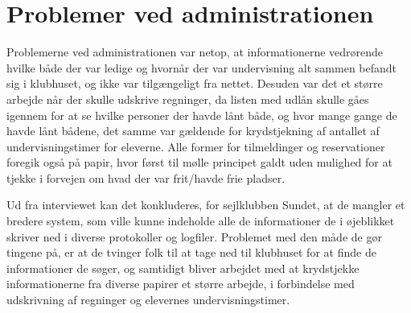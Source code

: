 \section*{Problemer ved administrationen}
Problemerne ved administrationen var netop, at informationerne vedrørende hvilke både der var ledige og hvornår der var undervisning alt sammen befandt sig i klubhuset, og ikke var tilgængeligt fra nettet. Desuden var det et større arbejde når der skulle udskrive regninger, da listen med udlån skulle gåes igennem for at se hvilke personer der havde lånt både, og hvor mange gange de havde lånt bådene,  det samme var gældende for krydstjekning af antallet af undervisningstimer for eleverne. Alle former for tilmeldinger og reservationer foregik også på papir, hvor først til mølle principet galdt uden mulighed for at tjekke i forvejen om hvad der var frit/havde frie pladser.

Ud fra interviewet kan det konkluderes, for sejlklubben Sundet, at de mangler et bredere system, som ville kunne indeholde alle de informationer de i øjeblikket skriver ned i diverse protokoller og logfiler. Problemet med den måde de gør tingene på, er at de tvinger folk til at tage ned til klubhuset for at finde de informationer de søger, og samtidigt bliver arbejdet med at krydstjekke informationerne fra diverse papirer et større arbejde, i forbindelse med udskrivning af regninger og elevernes undervisningstimer.  